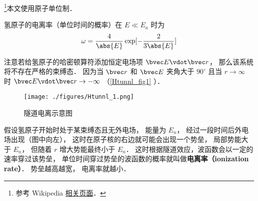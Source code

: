 
\footnote{参考 Wikipedia \href{https://en.wikipedia.org/wiki/Tunnel_ionization}{相关页面}．}本文使用原子单位制．

氢原子的电离率（单位时间的概率）在 $E \ll E_a$ 时为
\begin{equation}
\omega = \frac{4}{\abs{E}} \exp[-\frac{2}{3\abs{E}}]
\end{equation}


注意若给氢原子的哈密顿算符添加恒定电场项 $\bvec E \vdot \bvec r$， 那么该系统将不存在严格的束缚态． 因为当 $\bvec r$ 和 $\bvec E$ 夹角大于 $90^\circ$ 且当 $r\to\infty$ 时 $\bvec E \vdot \bvec r \to -\infty$ （\autoref{Htunnl_fig1} ）．

\begin{figure}[ht]
\centering
\texttt{[image: ./figures/Htunnl\_1.png]}
\caption{隧道电离示意图} \label{Htunnl_fig1}
\end{figure}

假设氢原子开始时处于某束缚态且无外电场， 能量为 $E_n$， 经过一段时间后外电场出现（图中向左）， 这时在原子核的右边就可能会出现一个势垒， 局部势能大于 $E_n$， 但随着 $r$ 增大势能最终小于 $E_n$． 这时根据隧道效应，波函数会以一定的速率穿过该势垒， 单位时间穿过势垒的波函数的概率就叫做\textbf{电离率（ionization rate）}． 势垒越高越宽， 电离率就越小．
